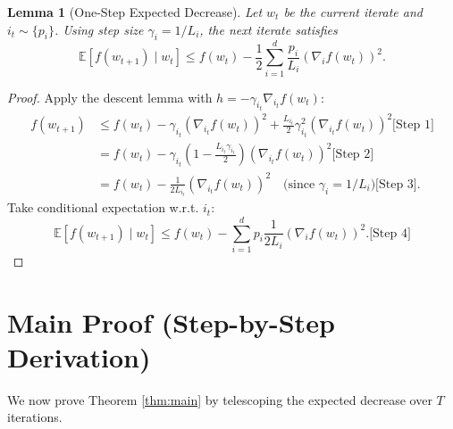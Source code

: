 \documentclass{article}
\newtheorem{lemma}{Lemma}
\newcommand{\E}{\mathbb{E}}
\newcommand{\step}[1]{\text{[Step #1]}}
\begin{document}
\begin{lemma}[One-Step Expected Decrease]
\label{lem:one_step}
Let $w_t$ be the current iterate and $i_t \sim \{p_i\}$. Using step size $\gamma_i = 1/L_i$, the next iterate satisfies
\begin{equation}
\E\left[ f(w_{t+1}) \mid w_t \right] \le f(w_t) - \frac{1}{2} \sum_{i=1}^d \frac{p_i}{L_i} \left( \nabla_i f(w_t) \right)^2.
\end{equation}
\end{lemma}
\begin{proof}
Apply the descent lemma with $h = -\gamma_{i_t} \nabla_{i_t} f(w_t)$:
\begin{align}
f(w_{t+1}) &\le f(w_t) - \gamma_{i_t} \left( \nabla_{i_t} f(w_t) \right)^2 + \frac{L_{i_t}}{2} \gamma_{i_t}^2 \left( \nabla_{i_t} f(w_t) \right)^2 \step{1} \\
&= f(w_t) - \gamma_{i_t} \left(1 - \frac{L_{i_t}\gamma_{i_t}}{2}\right) \left( \nabla_{i_t} f(w_t) \right)^2 \step{2} \\
&= f(w_t) - \frac{1}{2L_{i_t}} \left( \nabla_{i_t} f(w_t) \right)^2 \quad \text{(since $\gamma_i = 1/L_i$)} \step{3}.
\end{align}
Take conditional expectation w.r.t. $i_t$:
\begin{equation}
\E\left[ f(w_{t+1}) \mid w_t \right] \le f(w_t) - \sum_{i=1}^d p_i \frac{1}{2L_i} \left( \nabla_i f(w_t) \right)^2. \step{4}
\end{equation}
\end{proof}

\section*{Main Proof (Step-by-Step Derivation)}

We now prove Theorem \ref{thm:main} by telescoping the expected decrease over $T$ iterations.
\end{document}
